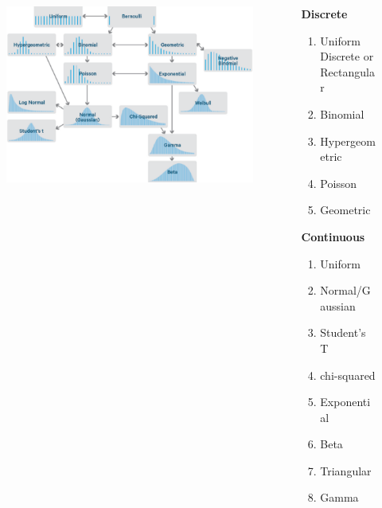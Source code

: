 \documentclass{beamer}
\begin{document}
\begin{frame}
	\begin{columns}
		\begin{column}{0.69\paperwidth}
			\begin{figure}
				\includegraphics[scale=.4]{Distributions}
			\end{figure}
		\end{column}
		\begin{column}{0.3\paperwidth}
				\textbf{Discrete}
				\begin{enumerate}
					\item Uniform Discrete or Rectangular
					\setlength{\itemsep}{0.mm}
					\item Binomial
					\setlength{\itemsep}{0.mm}
					\item Hypergeometric
					\setlength{\itemsep}{0.mm}
					\item Poisson
					\setlength{\itemsep}{0.mm}
					\item Geometric
				\end{enumerate}
				\textbf{Continuous}
				\begin{enumerate}
					\item Uniform 
					\setlength{\itemsep}{0.mm}
					\item Normal/Gaussian
					\setlength{\itemsep}{0.mm}
					\item Student’s T
					\setlength{\itemsep}{0.mm}
					\item chi-squared
					\item Exponential
					\setlength{\itemsep}{0.mm}
					\item Beta
					\setlength{\itemsep}{0.mm}
					\item Triangular
					\setlength{\itemsep}{0.mm}
					\item Gamma

				\end{enumerate}
		
		\end{column}
	\end{columns}

\end{frame}
\end{document}
